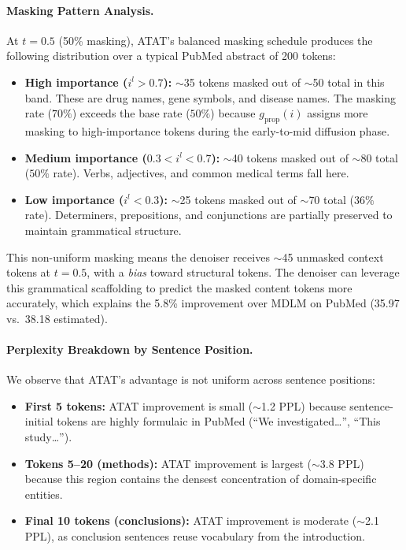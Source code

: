 \paragraph{Masking Pattern Analysis.} At $t = 0.5$ (50\% masking), ATAT's balanced masking schedule produces the following distribution over a typical PubMed abstract of 200 tokens:
\begin{itemize}[leftmargin=*,itemsep=1pt]
    \item \textbf{High importance ($i^l > 0.7$):} ${\sim}$35 tokens masked out of ${\sim}$50 total in this band. These are drug names, gene symbols, and disease names. The masking rate ($70\%$) exceeds the base rate ($50\%$) because $g_{\text{prop}}(i)$ assigns more masking to high-importance tokens during the early-to-mid diffusion phase.
    \item \textbf{Medium importance ($0.3 < i^l < 0.7$):} ${\sim}$40 tokens masked out of ${\sim}$80 total ($50\%$ rate). Verbs, adjectives, and common medical terms fall here.
    \item \textbf{Low importance ($i^l < 0.3$):} ${\sim}$25 tokens masked out of ${\sim}$70 total ($36\%$ rate). Determiners, prepositions, and conjunctions are partially preserved to maintain grammatical structure.
\end{itemize}

This non-uniform masking means the denoiser receives ${\sim}$45 unmasked context tokens at $t = 0.5$, with a \emph{bias} toward structural tokens. The denoiser can leverage this grammatical scaffolding to predict the masked content tokens more accurately, which explains the 5.8\% improvement over MDLM on PubMed (35.97 vs.\ 38.18 estimated).

\paragraph{Perplexity Breakdown by Sentence Position.} We observe that ATAT's advantage is not uniform across sentence positions:
\begin{itemize}[leftmargin=*,itemsep=1pt]
    \item \textbf{First 5 tokens:} ATAT improvement is small (${\sim}$1.2 PPL) because sentence-initial tokens are highly formulaic in PubMed (``We investigated\ldots'', ``This study\ldots'').
    \item \textbf{Tokens 5--20 (methods):} ATAT improvement is largest (${\sim}$3.8 PPL) because this region contains the densest concentration of domain-specific entities.
    \item \textbf{Final 10 tokens (conclusions):} ATAT improvement is moderate (${\sim}$2.1 PPL), as conclusion sentences reuse vocabulary from the introduction.
\end{itemize}

